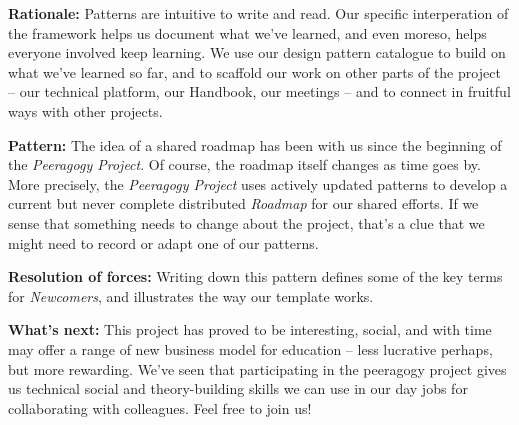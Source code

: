 \textbf{Rationale:}
Patterns are intuitive to write and read.  Our specific interperation of the framework helps us document what we've learned, and even moreso, helps everyone involved keep learning.  We use our design pattern catalogue to build on what we've learned so far, and to scaffold our work on other parts of the project -- our technical platform, our Handbook, our meetings -- and to connect in fruitful ways with other projects.  

\textbf{Pattern:}
The idea of a shared roadmap has been with us since the beginning of the \emph{Peeragogy Project}.  Of course, the roadmap itself changes as time goes by.  More precisely, the \emph{Peeragogy Project} uses actively updated patterns to develop a current but never complete distributed \emph{Roadmap} for our shared efforts.  If we sense that something needs to  change about the project, that’s a clue that we might need to record or adapt one of our patterns. 

\textbf{Resolution of forces:}  
Writing down this pattern defines some of the key terms for \emph{Newcomers}, and illustrates the way our template works.

\textbf{What's next:} 
This project has proved to be interesting, social, and with time may offer a range of new business model for education -- less lucrative perhaps, but more rewarding.  We've seen that participating in the peeragogy project gives us technical social and theory-building skills we can use in our day jobs for collaborating with colleagues.  Feel free to join us!